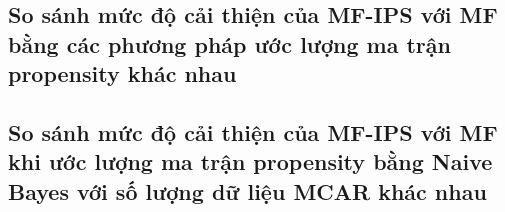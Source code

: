 \subsection{So sánh mức độ cải thiện của MF-IPS với MF bằng các phương pháp ước lượng ma trận propensity khác nhau}


\subsection{So sánh mức độ cải thiện của MF-IPS với MF khi ước lượng ma trận propensity bằng Naive Bayes với số lượng dữ liệu MCAR khác nhau}






